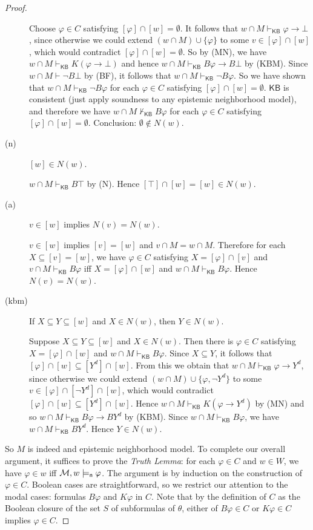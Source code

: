 \documentclass[12pt]{article}
\theoremstyle{definition}
\newcommand{\M}{{\cal M}}      %
\newcommand{\KB}{{\mathsf{KB}}}                 %
\newcommand{\modelsn}{\models_{\mathsf{n}}}                  %
\begin{document}
\begin{proof}
\begin{description}
    Choose $\varphi\in C$ satisfying $[\varphi]\cap[w]=\emptyset$.  It
    follows that $w\cap M\vdash_\KB\varphi\to\bot$, since otherwise we
    could extend $(w\cap M)\cup\{\varphi\}$ to some
    $v\in[\varphi]\cap[w]$, which would contradict
    $[\varphi]\cap[w]=\emptyset$.  So by (MN), we have
    $w\cap M\vdash_\KB K(\varphi\to\bot)$ and hence
    $w\cap M\vdash_\KB B\varphi\to B\bot$ by (KBM).  Since
    $w\cap M\vdash\lnot B\bot$ by (BF), it follows that
    $w\cap M\vdash_\KB \lnot B\varphi$.  So we have shown that
    $w\cap M\vdash_\KB \lnot B\varphi$ for each $\varphi\in C$
    satisfying $[\varphi]\cap[w]=\emptyset$.  $\KB$ is consistent
    (just apply soundness to any epistemic neighborhood model), and
    therefore we have $w\cap M\nvdash_\KB B\varphi$ for each
    $\varphi\in C$ satisfying
    $[\varphi]\cap[w]=\emptyset$. Conclusion: $\emptyset\notin N(w)$.

  \item[(n)] $[w]\in N(w)$.

    $w\cap M\vdash_\KB B\top$ by (N).  Hence
    $[\top]\cap[w]=[w]\in N(w)$.

  \item[(a)] $v\in[w]$ implies $N(v)=N(w)$.

    $v\in[w]$ implies $[v]=[w]$ and $v\cap M=w\cap M$.  Therefore for
    each $X\subseteq[v]=[w]$, we have $\varphi\in C$ satisfying
    $X=[\varphi]\cap[v]$ and $v\cap M\vdash_\KB B\varphi$ iff
    $X=[\varphi]\cap[w]$ and $w\cap M\vdash_\KB B\varphi$.  Hence
    $N(v)=N(w)$.

  \item[(kbm)] If $X\subseteq Y\subseteq[w]$ and $X\in N(w)$, then
    $Y\in N(w)$.

    Suppose $X\subseteq Y\subseteq[w]$ and $X\in N(w)$. Then there is
    $\varphi\in C$ satisfying $X=[\varphi]\cap[w]$ and
    $w\cap M\vdash_\KB B\varphi$.  Since $X\subseteq Y$, it follows
    that $[\varphi]\cap[w]\subseteq[Y^d]\cap[w]$. From this we obtain
    that $w\cap M\vdash_\KB\varphi\to Y^d$, since otherwise we could
    extend $(w\cap M)\cup\{\varphi,\lnot Y^d\}$ to some
    $v\in[\varphi]\cap[\lnot Y^d]\cap[w]$, which would contradict
    $[\varphi]\cap[w]\subseteq[Y^d]\cap[w]$.  Hence
    $w\cap M\vdash_\KB K(\varphi\to Y^d)$ by (MN) and so
    $w\cap M\vdash_\KB B\varphi\to B Y^d$ by (KBM).  Since
    $w\cap M\vdash_\KB B\varphi$, we have $w\cap M\vdash_\KB BY^d$.
    Hence $Y\in N(w)$.
  \end{description}
  So $M$ is indeed and epistemic neighborhood model. To complete our
  overall argument, it suffices to prove the \emph{Truth Lemma\/}: for
  each $\varphi\in C$ and $w\in W$, we have $\varphi\in w$ iff
  $\M,w\modelsn\varphi$. The argument is by induction on the
  construction of $\varphi\in C$.  Boolean cases are straightforward,
  so we restrict our attention to the modal cases: formulas $B\varphi$
  and $K\varphi$ in $C$.  Note that by the definition of $C$ as the
  Boolean closure of the set $S$ of subformulas of $\theta$, either of
  $B\varphi\in C$ or $K\varphi\in C$ implies $\varphi\in C$.


\end{proof}
\end{document}
